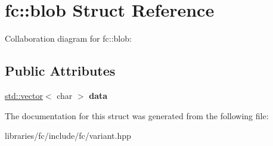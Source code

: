 \hypertarget{structfc_1_1blob}{}\section{fc\+:\+:blob Struct Reference}
\label{structfc_1_1blob}


Collaboration diagram for fc\+:\+:blob\+:
\subsection*{Public Attributes}
\begin{DoxyCompactItemize}
\item 
\mbox{\label{structfc_1_1blob_a88a9325abb9edd4766c3292e7fd89380}} 
\mbox{\hyperlink{classstd_1_1vector}{std\+::vector}}$<$ char $>$ {\bfseries data}
\end{DoxyCompactItemize}


The documentation for this struct was generated from the following file\+:\begin{DoxyCompactItemize}
\item 
libraries/fc/include/fc/variant.\+hpp\end{DoxyCompactItemize}
